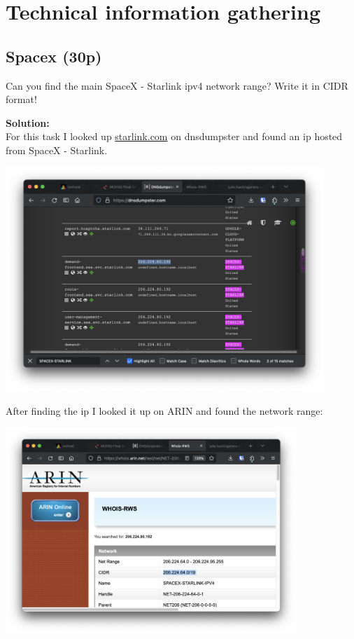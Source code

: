 \section{Technical information gathering}

\subsection{Spacex (30p)}
\addtocounter{points}{30}

Can you find the main SpaceX - Starlink ipv4 network range? Write it in CIDR format!

\textbf{Solution:}\\
For this task I looked up \url{starlink.com} on dnsdumpster and found an ip hosted from SpaceX - Starlink.

\begin{center}
    \includegraphics[width=12cm]{img/Technical information gathering/Spacex/Screenshot 2023-11-24 at 11.01.46.png}
\end{center}

After finding the ip I looked it up on ARIN and found the network range:

\begin{center}
    \includegraphics[width=11cm]{img/Technical information gathering/Spacex/Screenshot 2023-11-24 at 11.02.02.png}
\end{center}

